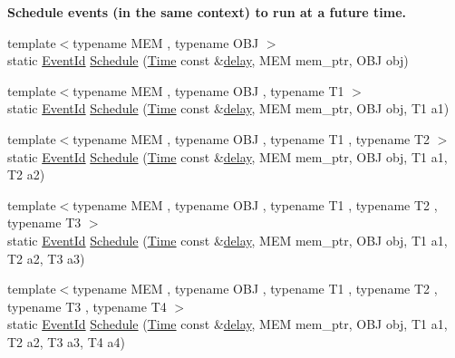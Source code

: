 \begin{Indent}{\bf Schedule events (in the same context) to run at a future time.}\par
\begin{DoxyCompactItemize}
\item 
{\footnotesize template$<$typename M\+EM , typename O\+BJ $>$ }\\static \hyperlink{classns3_1_1EventId}{Event\+Id} \hyperlink{classns3_1_1Simulator_a671882c894a08af4a5e91181bf1eec13}{Schedule} (\hyperlink{classns3_1_1Time}{Time} const \&\hyperlink{mmwave_2model_2fading-traces_2fading__trace__generator_8m_a7964e6aa8f61a9d28973c8267a606ad8}{delay}, M\+EM mem\+\_\+ptr, O\+BJ obj)
\item 
{\footnotesize template$<$typename M\+EM , typename O\+BJ , typename T1 $>$ }\\static \hyperlink{classns3_1_1EventId}{Event\+Id} \hyperlink{classns3_1_1Simulator_aec5dd434c42edd6c38ef249d2960c321}{Schedule} (\hyperlink{classns3_1_1Time}{Time} const \&\hyperlink{mmwave_2model_2fading-traces_2fading__trace__generator_8m_a7964e6aa8f61a9d28973c8267a606ad8}{delay}, M\+EM mem\+\_\+ptr, O\+BJ obj, T1 a1)
\item 
{\footnotesize template$<$typename M\+EM , typename O\+BJ , typename T1 , typename T2 $>$ }\\static \hyperlink{classns3_1_1EventId}{Event\+Id} \hyperlink{classns3_1_1Simulator_abb0d49b06a51b02a76f8fa3592273423}{Schedule} (\hyperlink{classns3_1_1Time}{Time} const \&\hyperlink{mmwave_2model_2fading-traces_2fading__trace__generator_8m_a7964e6aa8f61a9d28973c8267a606ad8}{delay}, M\+EM mem\+\_\+ptr, O\+BJ obj, T1 a1, T2 a2)
\item 
{\footnotesize template$<$typename M\+EM , typename O\+BJ , typename T1 , typename T2 , typename T3 $>$ }\\static \hyperlink{classns3_1_1EventId}{Event\+Id} \hyperlink{classns3_1_1Simulator_ad705a04f3273ca06c87278bb1f9f8f50}{Schedule} (\hyperlink{classns3_1_1Time}{Time} const \&\hyperlink{mmwave_2model_2fading-traces_2fading__trace__generator_8m_a7964e6aa8f61a9d28973c8267a606ad8}{delay}, M\+EM mem\+\_\+ptr, O\+BJ obj, T1 a1, T2 a2, T3 a3)
\item 
{\footnotesize template$<$typename M\+EM , typename O\+BJ , typename T1 , typename T2 , typename T3 , typename T4 $>$ }\\static \hyperlink{classns3_1_1EventId}{Event\+Id} \hyperlink{classns3_1_1Simulator_a8a57dab71e4e0dc8daa30439f282d4bd}{Schedule} (\hyperlink{classns3_1_1Time}{Time} const \&\hyperlink{mmwave_2model_2fading-traces_2fading__trace__generator_8m_a7964e6aa8f61a9d28973c8267a606ad8}{delay}, M\+EM mem\+\_\+ptr, O\+BJ obj, T1 a1, T2 a2, T3 a3, T4 a4)

\end{DoxyCompactItemize}
\end{Indent}
